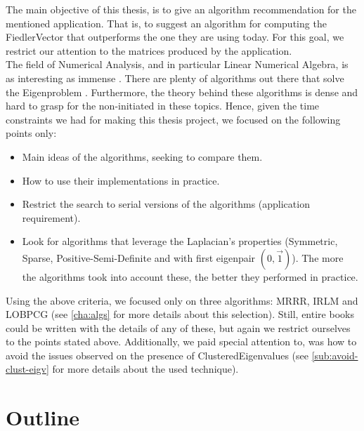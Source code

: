 The main objective of this thesis, is to give an algorithm
recommendation for the mentioned application. That is, to suggest
an algorithm for computing the \gls{FiedlerVector} that outperforms
the one they are using today. For this goal, we restrict our attention
to the matrices produced by the application. \\

The field of Numerical Analysis, and in particular Linear Numerical
Algebra, is as interesting as immense \cite{golub13}. There are plenty
of algorithms out there that solve the Eigenproblem
\cite{golub00}. Furthermore, the theory behind 
these algorithms is dense and hard to 
grasp for the non-initiated in these topics. Hence, given
the time constraints we had for making this thesis project, we focused
on the following points only:

\begin{itemize}
\item Main ideas of the algorithms, seeking to compare them.
\item How to use their implementations in practice.
\item Restrict the search to serial versions of the algorithms
  (application requirement).
\item Look for algorithms that leverage the \gls{Laplacian}'s properties
  (Symmetric, Sparse, Positive-Semi-Definite and with first eigenpair
  $(0,\vec{1})$). The more the algorithms took into account these, the
  better they performed in practice. 
\end{itemize}

Using the above criteria, we focused only on three algorithms: \gls{MRRR},
\gls{IRLM} and \gls{LOBPCG} (see \cref{cha:algs} for more details
about this selection). Still, entire books could be written with the 
details of any of these, but again we restrict ourselves to the points
stated above. Additionally, we paid 
special attention to, was how to avoid the issues observed on the
presence of \gls{ClusteredEigenvalues} (see
\cref{sub:avoid-clust-eigv} for more details about the used
technique). 

\section{Outline}

